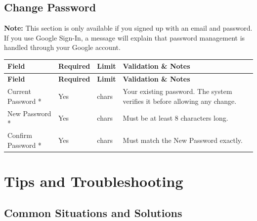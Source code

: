 \documentclass[12pt, a4paper]{article}
\newenvironment{fieldtable}{%
  \begin{longtable}{|>{\raggedright\arraybackslash}p{2.2cm}|>{\centering\arraybackslash}p{1.8cm}|>{\raggedright\arraybackslash}p{2.2cm}|>{\raggedright\arraybackslash}p{7.3cm}|}
  \hline
  \rowcolor{lightgray}
  \textbf{Field} & \textbf{Required} & \textbf{Limit} & \textbf{Validation \& Notes} \\
  \hline
  \endfirsthead
  \hline
  \rowcolor{lightgray}
  \textbf{Field} & \textbf{Required} & \textbf{Limit} & \textbf{Validation \& Notes} \\
  \hline
  \endhead
  \hline
  \endfoot
}{%
  \end{longtable}
}
\newcommand{\fieldrow}[4]{%
  #1 & #2 & #3 & #4 \\ \hline
}
\begin{document}
\subsection{Change Password}

\textbf{Note:} This section is only available if you signed up with an email and password. If you use Google Sign-In, a message will explain that password management is handled through your Google account.

\begin{fieldtable}
  \fieldrow{Current Password *}{Yes}{16 chars}{Your existing password. The system verifies it before allowing any change.}
  \fieldrow{New Password *}{Yes}{16 chars}{Must be at least 8 characters long.}
  \fieldrow{Confirm Password *}{Yes}{16 chars}{Must match the New Password exactly.}
\end{fieldtable}

\newpage
\section{Tips and Troubleshooting}

\subsection{Common Situations and Solutions}
\end{document}
